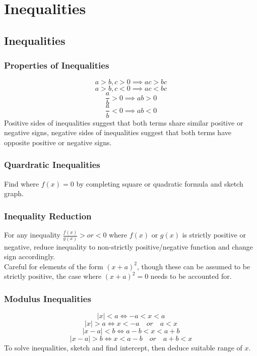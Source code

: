 \documentclass[../main]{subfiles}
\begin{document}
\section{Inequalities}

\subsection{Inequalities}

	\subsubsection{Properties of Inequalities}
	\[ a > b , c > 0 \implies ac > bc \]
	\[ a > b , c < 0 \implies ac < bc \]
	\[ \frac{a}{b} > 0 \implies ab > 0 \]
	\[ \frac{a}{b} < 0 \implies ab < 0 \]
	Positive sides of inequalities suggest that both terms share similar positive or negative signs, negative sides of inequalities suggest that both terms have opposite positive or negative signs.
	\subsubsection{Quardratic Inequalities}
	Find where \(f(x)=0\) by completing square or quadratic formula and sketch graph.
	\subsubsection{Inequality Reduction}
	For any inequality \(\frac{f(x)}{g(x)} > or < 0\) where \(f(x)\) or \(g(x)\) is strictly positive or negative, reduce inequality to non-strictly positive/negative function and change sign accordingly. \\
	Careful for elements of the form \((x+a)^2\), though these can be assumed to be strictly positive, the case where \((x+a)^2=0\) needs to be accounted for.
	\subsubsection{Modulus Inequalities}
	\[ |x| < a \iff -a < x < a \]
	\[ |x| > a \iff x  < -a \quad or \quad a < x \]
	\[ |x-a| < b \iff a-b < x < a+b \]
	\[ |x-a| > b \iff x < a-b \quad or \quad a+b < x \]
	To solve inequalities, sketch and find intercept, then deduce suitable range of \(x\).
\end{document}
